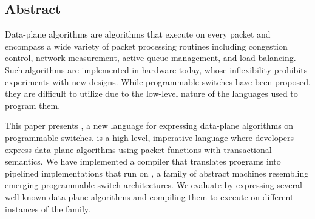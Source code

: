 \subsection*{Abstract}

Data-plane algorithms are algorithms that execute on every packet and encompass
a wide variety of packet processing routines including congestion control,
network measurement, active queue management, and load balancing. Such 
algorithms are implemented in hardware today, whose inflexibility prohibits
experiments with new designs. While programmable switches have been proposed, 
they are difficult to utilize due to the low-level nature of the languages
used to program them.

This paper presents \pktlanguage, a new language for expressing data-plane
algorithms on programmable switches. \pktlanguage is a high-level, imperative
language where developers express data-plane algorithms using packet functions
with transactional semantics. We have implemented a compiler that translates
\pktlanguage programs into pipelined implementations that run on \absmachine, a
family of abstract machines resembling emerging programmable switch
architectures. We evaluate \pktlanguage by expressing several well-known
data-plane algorithms and compiling them to execute on different instances of
the \absmachine family.
